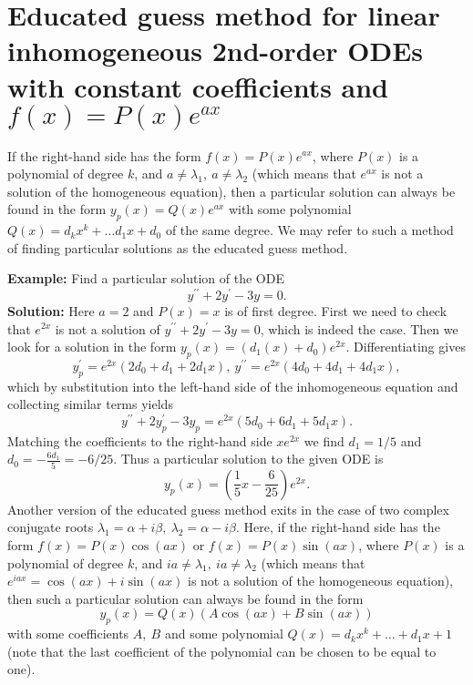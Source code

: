 \documentclass[11pt,a4paper]{article}
\begin{document}
	\section{Educated guess method for linear inhomogeneous 2nd-order ODEs with constant coefficients and $f(x) = P(x)e^{ax}$}
	If the right-hand side has the form $f(x) = P(x)e^{ax}$, where $P(x)$ is a polynomial of degree $k$, and $a \neq \lambda_1,\ a \neq \lambda_2$ (which means that $e^{ax}$ is not a solution of the homogeneous equation), then a particular solution can always be found in the form $y_p(x) = Q(x)e^{ax}$ with some polynomial $Q(x) = d_kx^k + \ldots d_1x+d_0$ of the same degree. We may refer to such a method of finding particular solutions as the educated guess method.\par
	\textbf{Example:} Find a particular solution of the ODE
	$$
	y^{\prime\prime} + 2y^\prime - 3y = 0.
	$$
	\textbf{Solution:} Here $a = 2$ and $P(x) = x$ is of first degree. First we need to check that $e^{2x}$ is not a solution of $y^{\prime\prime} + 2y^\prime - 3y = 0$, which is indeed the case. Then we look for a solution in the form $y_p(x) = (d_1(x) + d_0)e^{2x}$. Differentiating gives
	$$
	y^\prime_p = e^{2x}(2d_0+d_1+2d_1x),\ y^{\prime\prime} = e^{2x}(4d_0+4d_1+4d_1x),
	$$
	which by substitution into the left-hand side of the inhomogeneous equation and collecting similar terms yields
	$$
	y^{\prime\prime} + 2y^\prime_p-3y_p = e^{2x}(5d_0+6d_1+5d_1x).
	$$
	Matching the coefficients to the right-hand side $xe^{2x}$ we find $d_1 = 1/5$ and $d_0 = -\frac{6d_1}{5} = -6/25$. Thus a particular solution to the given ODE is
	$$
	y_p(x) = \left(\frac{1}{5}x-\frac{6}{25}\right)e^{2x}.
	$$
	Another version of the educated guess method exits in the case of two complex conjugate roots $\lambda_1 = \alpha + i\beta,\ \lambda_2 = \alpha − i\beta$. Here, if the right-hand side has the form $f(x) = P(x) \cos (ax)$ or $f(x) = P(x) \sin (ax)$, where $P(x)$ is a polynomial of degree $k$, and $ia \neq \lambda_1,\ ia \neq \lambda_2$ (which means that $e^{iax} = \cos(ax) + i\sin(ax)$ is not a solution of the homogeneous equation), then such a particular solution can always be found in the form
	\begin{equation}\label{2.49}
		y_p(x) = Q(x)(A\cos(ax)+B\sin(ax))
	\end{equation}
	with some coefficients $A,\ B$ and some polynomial $Q(x) = d_kx^k + \ldots + d_1x+1$ (note that the last coefficient of the polynomial can be chosen to be equal to one).
\end{document}
